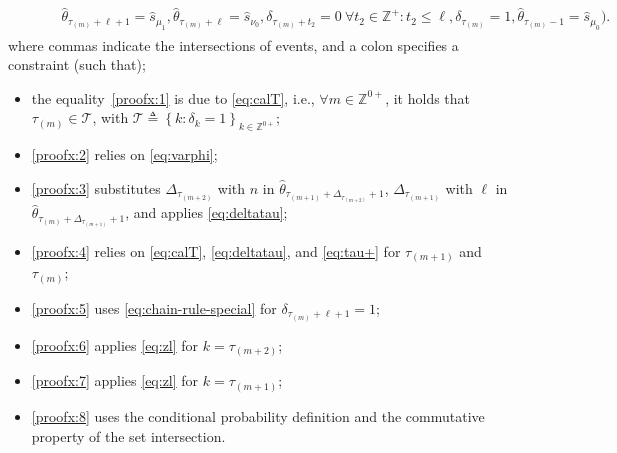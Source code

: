 \documentclass[journal,twoside,web]{ieeecolor}
\begin{document}
\begin{figure*}[ht]
\begin{align}
\begin{aligned}
& \qquad~ \hat{\theta}_{\tau_{(m)}+\ell+1} = \hat{s}_{\mu_1},\hat{\theta}_{\tau_{(m)}+\ell} = \hat{s}_{\nu_{0}}, \delta_{\tau_{(m)}+t_{2}}=0 ~ \forall t_{2}\in\mathbb{Z}^{+} : t_{2}\leq \ell, \delta_{\tau_{(m)}}=1, \hat{\theta}_{\tau_{(m)}-1} = \hat{s}_{\mu_0}).
\end{aligned}
\end{align}
where commas indicate the intersections of events, and a colon specifies a constraint (such that);
\begin{itemize}
\item the equality~\eqref{proofx:1} is due to \eqref{eq:calT}, i.e., $\forall m \in \mathbb{Z}^{0+}$, it holds that $\tau_{(m)}\in\mathcal{T}$, with $\mathcal{T}\triangleq \left\{ k : \delta_k = 1 \right\}_{k\in \mathbb{Z}^{0+}}$;
\item \eqref{proofx:2} relies on \eqref{eq:varphi};
\item \eqref{proofx:3} substitutes $\mathit{\Delta}_{\tau_{(m+2)}}$ with $n$ in $\hat{\theta}_{\tau_{(m+1)}+\mathit{\Delta}_{\tau_{(m+2)}}+1}$, $\mathit{\Delta}_{\tau_{(m+1)}}$ with $\ell$ in 
$\hat{\theta}_{\tau_{(m)}+\mathit{\Delta}_{\tau_{(m+1)}}+1}$, and applies \eqref{eq:deltatau};
\item \eqref{proofx:4} relies on \eqref{eq:calT}, \eqref{eq:deltatau}, and \eqref{eq:tau+} for $\tau_{(m+1)}$ and $\tau_{(m)}$;
\item \eqref{proofx:5} uses \eqref{eq:chain-rule-special} for $\delta_{\tau_{(m)}+\ell+1}=1$;
\item \eqref{proofx:6} applies \eqref{eq:zl} for $k=\tau_{(m+2)}$;
\item \eqref{proofx:7} applies \eqref{eq:zl} for $k=\tau_{(m+1)}$;
\item \eqref{proofx:8} uses the conditional probability definition and the commutative property of the set intersection.
\end{itemize}
\end{figure*}
\end{document}
